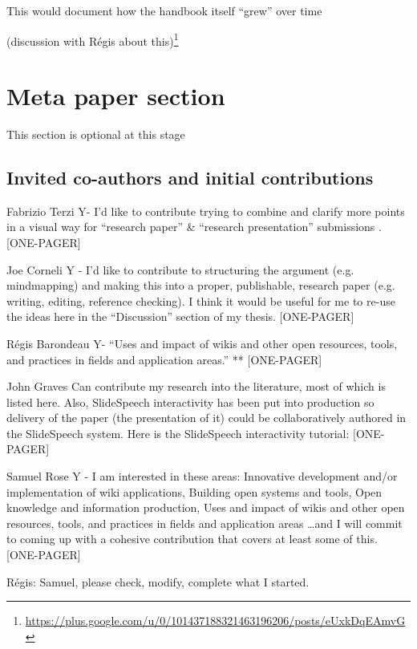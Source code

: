 \documentclass{acm_proc_article-sp}
\begin{document}
            This would document how the handbook itself ``grew'' over time

            (discussion with R\'egis about this)\footnote{\url{https://plus.google.com/u/0/101437188321463196206/posts/eUxkDqEAmvG}}


%
%
%
%

\section{Meta paper section}

This section is optional at this stage

\subsection{Invited co-authors and initial contributions}

    Fabrizio Terzi Y- I'd like to contribute trying to combine and clarify more points in a visual way for ``research paper'' \& ``research presentation'' submissions . [ONE-PAGER]

    Joe Corneli Y - I'd like to contribute to structuring the argument (e.g. mindmapping) and making this into a proper, publishable, research paper (e.g. writing, editing, reference checking). I think it would be useful for me to re-use the ideas here in the ``Discussion'' section of my thesis. [ONE-PAGER]

    R\'egis Barondeau Y- ``Uses and impact of wikis and other open resources, tools, and practices in fields and application areas.'' ** [ONE-PAGER]

    John Graves Can contribute my research into the literature, most of which is listed here. Also, SlideSpeech interactivity has been put into production so delivery of the paper (the presentation of it) could be collaboratively authored in the SlideSpeech system. Here is the SlideSpeech interactivity tutorial: [ONE-PAGER]

    Samuel Rose Y - I am interested in these areas: Innovative development and/or implementation of wiki applications, Building open systems and tools, Open knowledge and information production, Uses and impact of wikis and other open resources, tools, and practices in fields and application areas \ldots and I will commit to coming up with a cohesive contribution that covers at least some of this. [ONE-PAGER]

        R\'egis: Samuel, please check, modify, complete what I started. 
\end{document}
